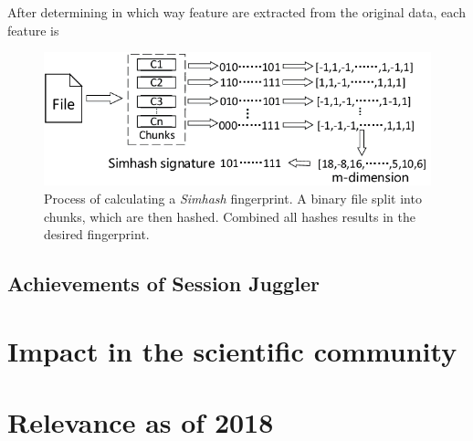 \documentclass[12pt,a4paper,DIV=calc]{scrartcl}
\begin{document}
After determining in which way feature are extracted from the original data, each feature is

\begin{figure}[H]
\includegraphics[scale=0.5]{./gfx/binary_chunk_fingerprint}
\centering
\caption{Process of calculating a \emph{Simhash} fingerprint.
A binary file split into chunks, which are then hashed.
Combined all hashes results in the desired fingerprint.~\cite{article:sampling-similarity}}\label{fig:gitalizer-relationship}
\end{figure}

\cite{inproc:simhash}

\subsection{}



\subsection{Achievements of Session Juggler}


\section{Impact in the scientific community}


\section{Relevance as of 2018}


\printbibliography
\end{document}
